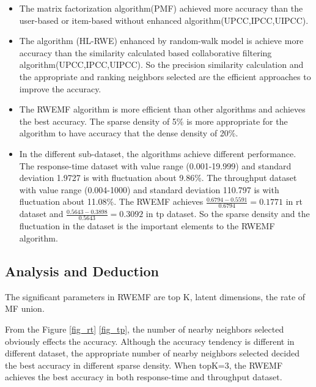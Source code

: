 \documentclass[conference]{IEEEtran}
\begin{document}
\begin{itemize}
\item The matrix factorization algorithm(PMF) achieved more accuracy than the user-based or item-based without enhanced algorithm(UPCC,IPCC,UIPCC). 
\item The algorithm (HL-RWE) enhanced by random-walk model is achieve more accuracy than the similarity calculated based collaborative filtering algorithm(UPCC,IPCC,UIPCC). So the precision similarity calculation and the appropriate and ranking neighbors selected are the efficient approaches to improve the accuracy.
\item The RWEMF algorithm is more efficient than other algorithms and achieves the best accuracy. The sparse density of 5\% is more appropriate for the algorithm to have accuracy that the dense density of 20\%.
\item In the different sub-dataset, the algorithms achieve different performance. The response-time dataset with value range (0.001-19.999) and standard deviation 1.9727 is with fluctuation about 9.86\%. The throughput dataset with value range (0.004-1000) and standard deviation 110.797 is with fluctuation about 11.08\%. The RWEMF achieves $\frac{0.6794-0.5591}{0.6794}=0.1771$ in rt dataset and $\frac{0.5643-0.3898}{0.5643}=0.3092$ in tp dataset. So the sparse density and the fluctuation in the dataset is the important elements to the RWEMF algorithm.
\end{itemize}

\subsection{Analysis and Deduction}
\par The significant parameters in RWEMF are top K, latent dimensions, the rate of MF union. 

\par From the Figure \ref{fig_rt} \ref{fig_tp}, the number of nearby neighbors selected obviously effects the accuracy. Although the accuracy tendency is different in different dataset, the appropriate number of nearby neighbors selected decided the best accuracy in different sparse density. When topK=3, the RWEMF achieves the best accuracy in both response-time and throughput dataset. 
\end{document}
